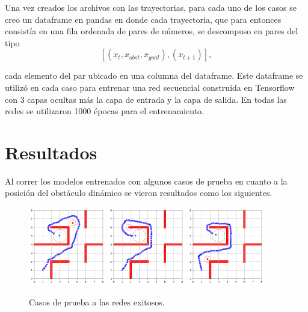 \documentclass[spanish,mexico]{article}
\numberwithin{equation}{section}
\theoremstyle{definition}
\theoremstyle{remark}
\begin{document}
Una vez creados los archivos con las trayectorias, para cada uno de los casos se creo un dataframe en pandas en donde cada trayectoria, que para entonces consistía en una fila ordenada de pares de números, se descompuso en pares del tipo
$$
\left[ (x_t, x_{obst}, x_{goal}), (x_{t+1})\right],
$$

cada elemento del par ubicado en una columna del dataframe. Este dataframe se utilizó en cada caso para entrenar una red secuencial construida en Tensorflow con 3 capas ocultas más la capa de entrada y la capa de salida. En todas las redes se utilizaron 1000 épocas para el entrenamiento. 

\newpage
\section{Resultados}
Al correr los modelos entrenados con algunos casos de prueba en cuanto a la posición del obstáculo dinámico se vieron resultados como los siguientes.
\begin{figure}[!h]
  \centering
	{\includegraphics[width=0.3\textwidth]{img/win1.png}\label{fig:f1}}
  \hfill
  	{\includegraphics[width=0.3\textwidth]{img/win2.png}\label{fig:f2}}
  	\hfill
  	{\includegraphics[width=0.3\textwidth]{img/win3.png}\label{fig:f3}}
  \caption{Casos de prueba a las redes exitosos.}
\end{figure}
\end{document}
